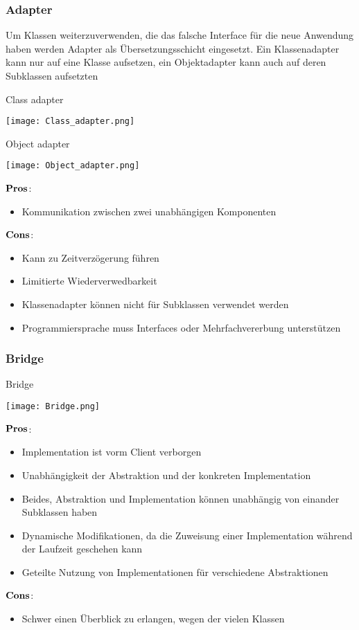 \subsubsection{Adapter}
Um Klassen weiterzuverwenden, die das falsche Interface für die neue Anwendung haben werden Adapter als Übersetzungsschicht eingesetzt. Ein Klassenadapter kann nur auf eine Klasse aufsetzen, ein Objektadapter kann auch auf deren Subklassen aufsetzten
\begin{table}[H]
\caption{Class adapter}
\texttt{[image: Class\_adapter.png]}	
\end{table}
\begin{table}[H]
\caption{Object adapter}
\texttt{[image: Object\_adapter.png]}	
\end{table}
\begin{multicols}{2}
$\bold{Pros}$:
\begin{itemize}
	\item Kommunikation zwischen zwei unabhängigen Komponenten 
\end{itemize}
\columnbreak
$\bold{Cons}$:
\begin{itemize}
	\item Kann zu Zeitverzögerung führen
	\item Limitierte Wiederverwedbarkeit 
	\item Klassenadapter können nicht für Subklassen verwendet werden
	\item Programmiersprache muss Interfaces oder Mehrfachvererbung unterstützen
\end{itemize}
\end{multicols}
\subsubsection{Bridge}
\begin{table}[H]
\caption{Bridge}
\texttt{[image: Bridge.png]}	
\end{table}
\begin{multicols}{2}
$\bold{Pros}$:
\begin{itemize}
	\item Implementation ist vorm Client verborgen
	\item Unabhängigkeit der Abstraktion und der konkreten Implementation
	\item Beides, Abstraktion und Implementation können unabhängig von einander Subklassen haben
	\item Dynamische Modifikationen, da die Zuweisung einer Implementation während der Laufzeit geschehen kann
	\item Geteilte Nutzung von Implementationen für verschiedene Abstraktionen  
\end{itemize}	
\columnbreak
$\bold{Cons}$:
\begin{itemize}
	\item Schwer einen Überblick zu erlangen, wegen der vielen Klassen
\end{itemize}
\end{multicols}
